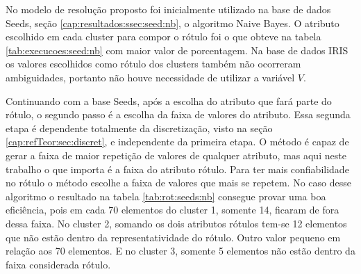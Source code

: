 No modelo de resolução proposto foi inicialmente utilizado na base de dados Seeds, seção \ref{cap:resultados:ssec:seed:nb}, o algoritmo Naive Bayes. O atributo escolhido em cada cluster para compor o rótulo foi o que obteve  na tabela \ref{tab:execucoes:seed:nb} com maior valor de porcentagem. Na base de dados IRIS os valores escolhidos como rótulo dos clusters   também não ocorreram ambiguidades, portanto não houve necessidade de utilizar a variável ${V}$.

Continuando com a base Seeds, após a escolha do atributo que fará parte do rótulo, o segundo passo é a escolha da faixa de valores do atributo. Essa segunda etapa é dependente totalmente da discretização, visto na seção \ref{cap:refTeor:sec:discret}, e independente da primeira etapa. O método é capaz de gerar a faixa de maior repetição de valores de qualquer atributo, mas aqui neste trabalho o que importa é a faixa do atributo rótulo. Para ter mais  confiabilidade  no rótulo o método escolhe a faixa de valores que mais se repetem. No caso desse algoritmo o resultado na tabela \ref{tab:rot:seeds:nb} consegue provar uma boa eficiência, pois em cada 70 elementos do cluster 1, somente 14, ficaram de fora dessa faixa. No cluster 2, somando os dois atributos rótulos tem-se 12 elementos que não estão dentro da representatividade do rótulo. Outro valor pequeno em relação aos 70 elementos. E no cluster 3, somente 5 elementos não estão dentro da faixa considerada rótulo.


